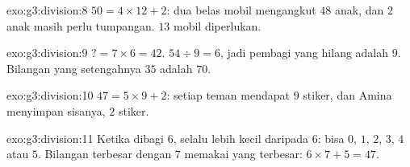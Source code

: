 \begin{solution}{exo:g3:division:8}
$50 = 4 \times 12 + 2$: dua belas mobil mengangkut $48$ anak, dan
$2$ anak masih perlu tumpangan. $13$ mobil diperlukan.
\end{solution}

\begin{solution}{exo:g3:division:9}
$? = 7 \times 6 = 42$. \quad
$54 \div 9 = 6$, jadi pembagi yang hilang adalah $9$. \quad
Bilangan yang setengahnya $35$ adalah $70$.
\end{solution}

\begin{solution}{exo:g3:division:10}
$47 = 5 \times 9 + 2$: setiap teman mendapat $9$ stiker, dan Amina
menyimpan sisanya, $2$ stiker.
\end{solution}

\begin{solution}{exo:g3:division:11}
Ketika dibagi $6$,  selalu lebih kecil daripada $6$: bisa
$0$, $1$, $2$, $3$, $4$ atau $5$. Bilangan terbesar dengan  $7$ memakai  yang terbesar: $6 \times 7 + 5 = 47$.

\end{solution}
